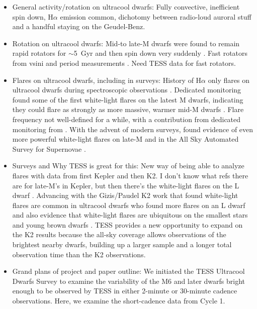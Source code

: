 \documentclass[twocolumn]{aastex62}
\begin{document}
\begin{itemize}
\item General activity/rotation on ultracool dwarfs:
Fully convective, inefficient spin down, H$\alpha$ emission common, dichotomy between radio-loud auroral stuff and a handful staying on the Geudel-Benz.
\item Rotation on ultracool dwarfs: 
Mid-to late-M dwarfs were found to remain rapid rotators for $\sim$5~Gyr and then spin down very suddenly \citep{Newton2016}. Fast rotators from vsini \citep{Reiners2010} and period measurements \citep{Harding2013}. Need TESS data for fast rotators. 
\item Flares on ultracool dwarfs, including in surveys:
History of H$\alpha$ only flares on ultracool dwarfs during spectroscopic observations \citep{Liebert1999,Hall2002,Schmidt2007}. Dedicated monitoring found some of the first white-light flares on the latest M dwarfs, indicating they could flare as strongly as more massive, warmer mid-M dwarfs \citet{Rockenfeller2006,Stelzer2006}. Flare frequency not well-defined for a while, with a contribution from dedicated monitoring from \citet{Hilton2011phd}. With the advent of modern surveys, found evidence of even more powerful white-light flares on late-M \citep{Schmidt2014} and \citep{Schmidt2016a} in the All Sky Automated Survey for Supernovae \citep[][ASAS-SN]{Shappee2016a}. 
\item Surveys and Why TESS is great for this:
New way of being able to analyze flares with data from first Kepler and then K2. I don't know what refs there are for late-M's in Kepler, but then there's the white-light flares on the L dwarf \citep{Gizis2013}. Advancing with the Gizis/Paudel K2 work that found white-light flares are common in ultracool dwarfs who found more flares on an L dwarf and also evidence that white-light flares are ubiquitous on the smallest stars and young brown dwarfs \citep{Gizis2017,Gizis2017a,Paudel2017}. TESS provides a new opportunity to expand on the K2 results because the all-sky coverage allows observations of the brightest nearby dwarfs, building up a larger sample and a longer total observation time than the K2 observations. 
\item Grand plans of project and paper outline:
We initiated the TESS Ultracool Dwarfs Survey to examine the variability of the M6 and later dwarfs bright enough to be observed by TESS in either 2-minute or 30-minute cadence observations. Here, we examine the short-cadence data from Cycle 1. 

\end{itemize}
\end{document}

